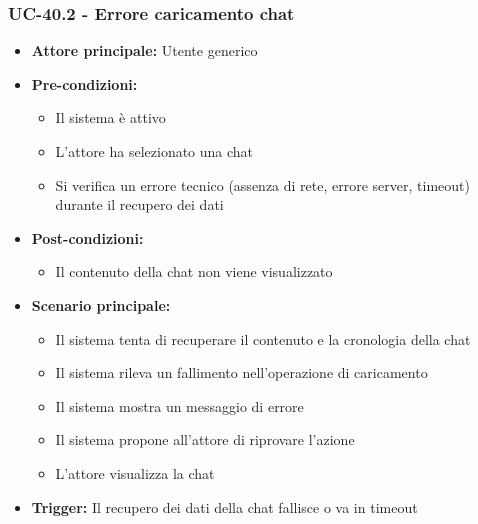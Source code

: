 \documentclass[a4paper,12pt]{article}
\begin{document}
\subsubsection{UC-40.2 - Errore caricamento chat} \label{subsec:UC-40.2}
\begin{itemize}
    \item \textbf{Attore principale:} Utente generico
    \item \textbf{Pre-condizioni:}
    \begin{itemize}
        \item Il sistema è attivo
        \item L'attore ha selezionato una chat
        \item Si verifica un errore tecnico (assenza di rete, errore server, timeout) durante il recupero dei dati
    \end{itemize}
    \item \textbf{Post-condizioni:} 
    \begin{itemize}
        \item Il contenuto della chat non viene visualizzato
    \end{itemize}
    \item \textbf{Scenario principale:} 
    \begin{itemize}
        \item Il sistema tenta di recuperare il contenuto e la cronologia della chat
        \item Il sistema rileva un fallimento nell'operazione di caricamento
        \item Il sistema mostra un messaggio di errore
        \item Il sistema propone all'attore di riprovare l'azione
        \item L'attore visualizza la chat 
    \end{itemize}
    \item \textbf{Trigger:} Il recupero dei dati della chat fallisce o va in timeout
\end{itemize}
\end{document}
